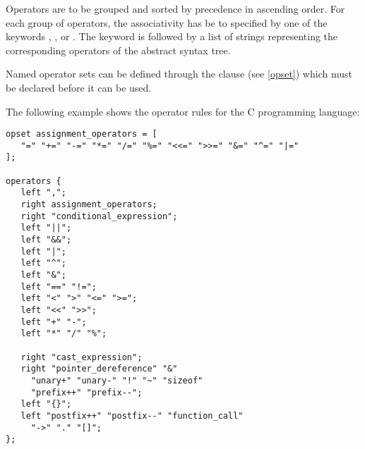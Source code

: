 \noindent
Operators are to be grouped and sorted by precedence in ascending order.
For each group of operators, the associativity has be to specified
by one of the keywords , , or .
The keyword is followed by a list of strings representing the
corresponding operators of the abstract syntax tree.

Named operator sets can be defined through the  clause
(see \ref{opset}) which must be declared before it can be used.

The following example shows the operator rules for the C
programming language:

\begin{lstlisting}
opset assignment_operators = [
   "=" "+=" "-=" "*=" "/=" "%=" "<<=" ">>=" "&=" "^=" "|="
];

operators {
   left ",";
   right assignment_operators;
   right "conditional_expression";
   left "||";
   left "&&";
   left "|";
   left "^";
   left "&";
   left "==" "!=";
   left "<" ">" "<=" ">=";
   left "<<" ">>";
   left "+" "-";
   left "*" "/" "%";

   right "cast_expression";
   right "pointer_dereference" "&"
	 "unary+" "unary-" "!" "~" "sizeof"
	 "prefix++" "prefix--";
   left "{}";
   left "postfix++" "postfix--" "function_call"
	 "->" "." "[]";
};
\end{lstlisting}

\endinput
